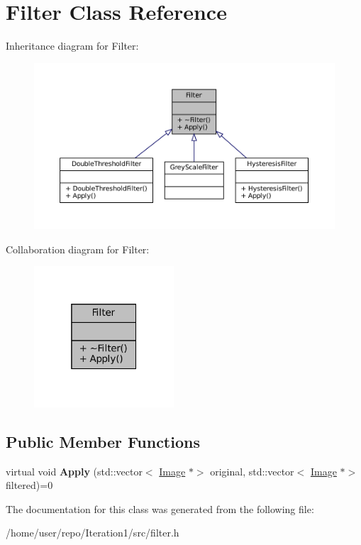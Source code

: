 \hypertarget{classFilter}{}\section{Filter Class Reference}
\label{classFilter}


Inheritance diagram for Filter\+:\nopagebreak
\begin{figure}[H]
\begin{center}
\leavevmode
\includegraphics[width=350pt]{classFilter__inherit__graph}
\end{center}
\end{figure}


Collaboration diagram for Filter\+:\nopagebreak
\begin{figure}[H]
\begin{center}
\leavevmode
\includegraphics[width=148pt]{classFilter__coll__graph}
\end{center}
\end{figure}
\subsection*{Public Member Functions}
\begin{DoxyCompactItemize}
\item 
\mbox{\label{classFilter_afab0d50af44a19a370ebe46c69b8ff4e}} 
virtual void {\bfseries Apply} (std\+::vector$<$ \hyperlink{classImage}{Image} $\ast$$>$ original, std\+::vector$<$ \hyperlink{classImage}{Image} $\ast$$>$ filtered)=0
\end{DoxyCompactItemize}


The documentation for this class was generated from the following file\+:\begin{DoxyCompactItemize}
\item 
/home/user/repo/\+Iteration1/src/filter.\+h\end{DoxyCompactItemize}
